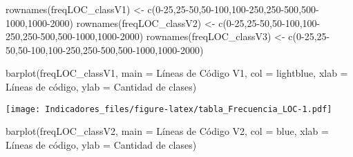 \documentclass[
]{article}
\newenvironment{Shaded}{\begin{snugshade}}{\end{snugshade}}
\newcommand{\AttributeTok}[1]{\textcolor[rgb]{0.77,0.63,0.00}{#1}}
\newcommand{\FunctionTok}[1]{\textcolor[rgb]{0.00,0.00,0.00}{#1}}
\newcommand{\NormalTok}[1]{#1}
\newcommand{\OtherTok}[1]{\textcolor[rgb]{0.56,0.35,0.01}{#1}}
\newcommand{\StringTok}[1]{\textcolor[rgb]{0.31,0.60,0.02}{#1}}
\begin{document}
\begin{Shaded}
\begin{Highlighting}[]
\FunctionTok{rownames}\NormalTok{(freqLOC\_classV1) }\OtherTok{\textless{}{-}} \FunctionTok{c}\NormalTok{(}\StringTok{\textquotesingle{}0{-}25\textquotesingle{}}\NormalTok{,}\StringTok{\textquotesingle{}25{-}50\textquotesingle{}}\NormalTok{,}\StringTok{\textquotesingle{}50{-}100\textquotesingle{}}\NormalTok{,}\StringTok{\textquotesingle{}100{-}250\textquotesingle{}}\NormalTok{,}\StringTok{\textquotesingle{}250{-}500\textquotesingle{}}\NormalTok{,}\StringTok{\textquotesingle{}500{-}1000\textquotesingle{}}\NormalTok{,}\StringTok{\textquotesingle{}1000{-}2000\textquotesingle{}}\NormalTok{)}
\FunctionTok{rownames}\NormalTok{(freqLOC\_classV2) }\OtherTok{\textless{}{-}} \FunctionTok{c}\NormalTok{(}\StringTok{\textquotesingle{}0{-}25\textquotesingle{}}\NormalTok{,}\StringTok{\textquotesingle{}25{-}50\textquotesingle{}}\NormalTok{,}\StringTok{\textquotesingle{}50{-}100\textquotesingle{}}\NormalTok{,}\StringTok{\textquotesingle{}100{-}250\textquotesingle{}}\NormalTok{,}\StringTok{\textquotesingle{}250{-}500\textquotesingle{}}\NormalTok{,}\StringTok{\textquotesingle{}500{-}1000\textquotesingle{}}\NormalTok{,}\StringTok{\textquotesingle{}1000{-}2000\textquotesingle{}}\NormalTok{)}
\FunctionTok{rownames}\NormalTok{(freqLOC\_classV3) }\OtherTok{\textless{}{-}} \FunctionTok{c}\NormalTok{(}\StringTok{\textquotesingle{}0{-}25\textquotesingle{}}\NormalTok{,}\StringTok{\textquotesingle{}25{-}50\textquotesingle{}}\NormalTok{,}\StringTok{\textquotesingle{}50{-}100\textquotesingle{}}\NormalTok{,}\StringTok{\textquotesingle{}100{-}250\textquotesingle{}}\NormalTok{,}\StringTok{\textquotesingle{}250{-}500\textquotesingle{}}\NormalTok{,}\StringTok{\textquotesingle{}500{-}1000\textquotesingle{}}\NormalTok{,}\StringTok{\textquotesingle{}1000{-}2000\textquotesingle{}}\NormalTok{)}

\FunctionTok{barplot}\NormalTok{(freqLOC\_classV1,}
        \AttributeTok{main =} \StringTok{\textquotesingle{}Líneas de Código V1\textquotesingle{}}\NormalTok{,}
        \AttributeTok{col =} \StringTok{\textquotesingle{}lightblue\textquotesingle{}}\NormalTok{,}
        \AttributeTok{xlab =} \StringTok{\textquotesingle{}Líneas de código\textquotesingle{}}\NormalTok{,}
        \AttributeTok{ylab =} \StringTok{\textquotesingle{}Cantidad de clases\textquotesingle{}}\NormalTok{)}
\end{Highlighting}
\end{Shaded}

\texttt{[image: Indicadores\_files/figure-latex/tabla\_Frecuencia\_LOC-1.pdf]}

\begin{Shaded}
\begin{Highlighting}[]
\FunctionTok{barplot}\NormalTok{(freqLOC\_classV2,}
        \AttributeTok{main =} \StringTok{\textquotesingle{}Líneas de Código V2\textquotesingle{}}\NormalTok{,}
        \AttributeTok{col =} \StringTok{\textquotesingle{}blue\textquotesingle{}}\NormalTok{,}
        \AttributeTok{xlab =} \StringTok{\textquotesingle{}Líneas de código\textquotesingle{}}\NormalTok{,}
        \AttributeTok{ylab =} \StringTok{\textquotesingle{}Cantidad de clases\textquotesingle{}}\NormalTok{)}
\end{Highlighting}
\end{Shaded}
\end{document}
